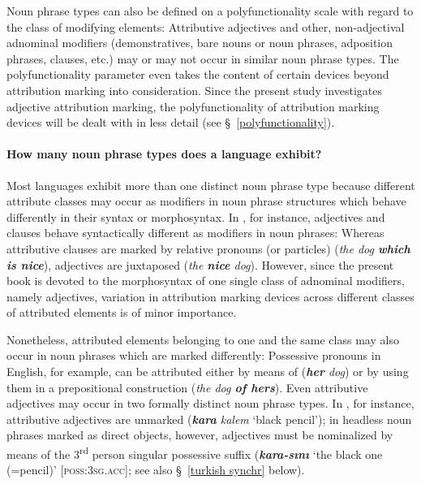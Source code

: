 Noun phrase types can also be defined on a polyfunctionality scale with regard to the class of modifying elements: Attributive adjectives and other, non-adjectival adnominal modifiers (demonstratives, bare nouns or noun phrases, adposition phrases, clauses, etc.) may or may not occur in similar noun phrase types. The polyfunctionality parameter even takes the content of certain devices beyond attribution marking into consideration. Since the present study investigates adjective attribution marking, the polyfunctionality of attribution marking devices will be dealt with in less detail (see \S~\ref{polyfunctionality}). 

\paragraph{How many noun phrase types does a language exhibit?} 
Most languages exhibit more than one distinct noun phrase type because different attribute classes may occur as modifiers in noun phrase structures which behave differently in their syntax or morphosyntax. In , for instance, adjectives and clauses behave syntactically different as modifiers in noun phrases: Whereas attributive clauses are marked by relative pronouns (or particles) (\textit{the dog \textbf{which is nice}}), adjectives are juxtaposed (\textit{the \textbf{nice} dog}). However, since the present book is devoted to the morphosyntax of one single class of adnominal modifiers, namely adjectives, variation in attribution marking devices across different classes of attributed elements is of minor importance. 

Nonetheless, attributed elements belonging to one and the same class may also occur in noun phrases which are marked differently: Possessive pronouns in English, for example, can be attributed either by means of  (\textit{\textbf{her} dog}) or by using them in a prepositional construction (\textit{the dog \textbf{of hers}}). Even attributive adjectives may occur in two formally distinct noun phrase types. In , for instance, attributive adjectives are unmarked (\textit{\textbf{kara} kalem} ‘black pencil’); in headless noun phrases marked as direct objects, however, adjectives must be nominalized by means of the 3\textsuperscript{rd} person singular possessive suffix (\textit{\textbf{kara-sını}} ‘the black one (=pencil)’ [\textsc{poss:3sg.acc}]; see also \S~\ref{turkish synchr} below). 


